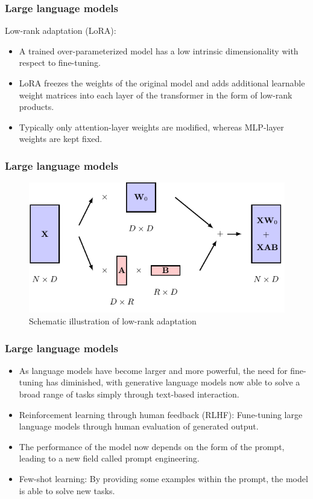 \documentclass{beamer}
\begin{document}
\begin{frame}
    \frametitle{Large language models}
    Low-rank adaptation (LoRA):
    \begin{itemize}
        \item A trained over-parameterized model has a low intrinsic dimensionality with respect to fine-tuning.
        \item LoRA freezes the weights of the original model and adds additional learnable weight matrices into each layer of the transformer in the form of low-rank products.
        \item Typically only attention-layer weights are modified, whereas MLP-layer weights are kept fixed.
    \end{itemize}
\end{frame}

\begin{frame}
    \frametitle{Large language models}
    \begin{figure}
        \caption{Schematic illustration of low-rank adaptation}
        \includegraphics{Figure_21.pdf}
    \end{figure}
\end{frame}

\begin{frame}
    \frametitle{Large language models}
    \begin{itemize}
        \item As language models have become larger and more powerful, the need for fine-tuning has diminished, with generative language models now able to solve a broad range of tasks simply through text-based interaction.
        \item Reinforcement learning through human feedback (RLHF): Fune-tuning large language models through human evaluation of generated output.
        \item The performance of the model now depends on the form of the prompt, leading to a new field called prompt engineering.
        \item Few-shot learning: By providing some examples within the prompt, the model is able to solve new tasks.
    \end{itemize}
\end{frame}
\end{document}
